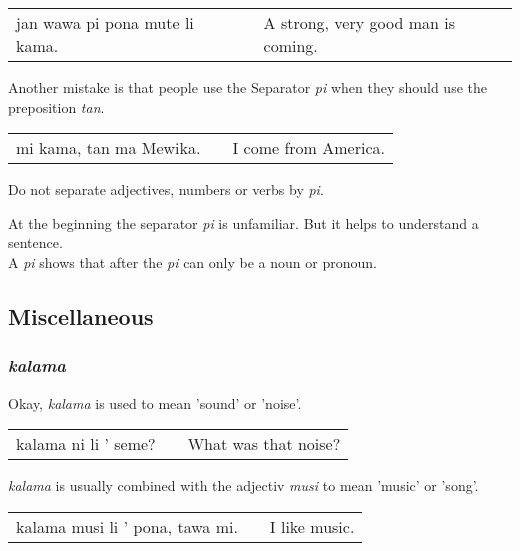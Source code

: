 \begin{supertabular}{p{5,5cm}|ll}
jan wawa pi pona mute li kama. && A strong, very good man is coming. \\ 
\end{supertabular}

Another mistake is that people use the Separator \textit{pi} when they should use the preposition \textit{tan}. 

\begin{supertabular}{p{5,5cm}|ll}
mi kama, tan ma Mewika. && I come from America. \\
\end{supertabular}  

Do not separate adjectives, numbers or verbs by \textit{pi}.

At the beginning the separator \textit{pi} is unfamiliar. 
But it helps to understand a sentence. \\
A \textit{pi} shows that after the \textit{pi} can only be a noun or pronoun.

%
\subsection*{Miscellaneous}
%
\subsubsection*{\textit{kalama}}
%
%
Okay, \textit{kalama} is used to mean 'sound' or 'noise'.  

\begin{supertabular}{p{5,5cm}|ll}
kalama ni li ' seme? && What was that noise? \\
\end{supertabular}  

\textit{kalama} is usually combined with the adjectiv \textit{musi} to mean 'music' or 'song'. 

\begin{supertabular}{p{5,5cm}|ll}
kalama musi li ' pona, tawa mi. && I like music. \\
\end{supertabular}  


